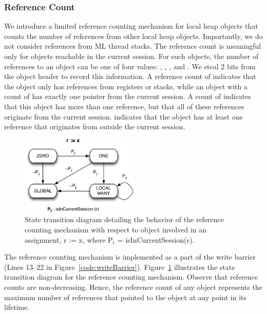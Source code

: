 \subsubsection{Reference Count}

We introduce a limited reference counting mechanism for local heap objects that
counts the number of references from other local heap objects. Importantly, we
do not consider references from ML thread stacks. The reference count is
meaningful only for objects reachable in the current session. For such objects,
the number of references to an object can be one of four values: ,
, , and . We steal 2 bits from the object
header to record this information. A reference count of  indicates
that the object only has references from registers or stacks, while an object
with a count of  has exactly one pointer from the current session. A
count of  indicates that this object has more than one
reference, but that all of these references originate from the current session.
 indicates that the object has at least one reference that
originates from outside the current session.

\begin{figure}[t]
\centering
\includegraphics[width=0.5\textwidth]{Figures/std_reference_count}
\caption{State transition diagram detailing the behavior of the reference
counting mechanism with respect to object  involved in an assignment,
\textsf{r := x}, where \textsf{P}$_\textrm{r}$ = \textsf{isInCurrentSession(r)}.}
\label{fig:std_ref_count}
\end{figure}

The reference counting mechanism is implemented as a part of the write barrier
(Lines 13--22 in Figure~\ref{code:writeBarrier}).
Figure~\ref{fig:std_ref_count} illustrates the state transition diagram for the
reference counting mechanism. Observe that reference counts are non-decreasing.
Hence, the reference count of any object represents the maximum number of
references that pointed to the object at any point in its lifetime.

